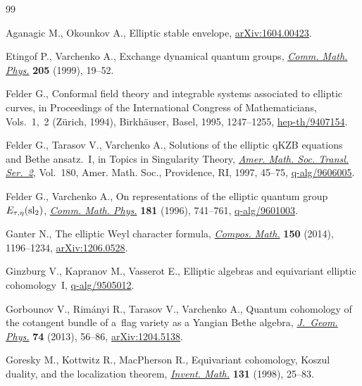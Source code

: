 \begin{thebibliography}{99}
\footnotesize\itemsep=0.5pt

Aganagic M., Okounkov A., Elliptic stable envelope, \href{https://arxiv.org/abs/1604.00423}{arXiv:1604.00423}.

Etingof P., Varchenko A., Exchange dynamical quantum groups, \href{https://doi.org/10.1007/s002200050665}{\textit{Comm.
 Math. Phys.}} \textbf{205} (1999), 19--52.

Felder G., Conformal field theory and integrable systems associated to elliptic
 curves, in Proceedings of the {I}nternational {C}ongress of {M}athematicians,
 {V}ols.~1,~2 ({Z}\"{u}rich, 1994), Birkh\"{a}user, Basel, 1995, 1247--1255,
 \href{https://arxiv.org/abs/hep-th/9407154}{hep-th/9407154}.

Felder G., Tarasov V., Varchenko A., Solutions of the elliptic q{KZB} equations
 and {B}ethe ansatz.~{I}, in Topics in Singularity Theory, \href{https://doi.org/10.1090/trans2/180/04}{\textit{Amer. Math.
 Soc. Transl. Ser.~2}}, Vol.~180, Amer. Math. Soc., Providence, RI, 1997,
 45--75, \href{https://arxiv.org/abs/q-alg/9606005}{q-alg/9606005}.

Felder G., Varchenko A., On representations of the elliptic quantum group
 {$E_{\tau,\eta}({\rm sl}_2)$}, \href{https://doi.org/10.1007/BF02101296}{\textit{Comm. Math. Phys.}} \textbf{181}
 (1996), 741--761, \href{https://arxiv.org/abs/q-alg/9601003}{q-alg/9601003}.

Ganter N., The elliptic {W}eyl character formula, \href{https://doi.org/10.1112/S0010437X1300777X}{\textit{Compos. Math.}}
 \textbf{150} (2014), 1196--1234, \href{https://arxiv.org/abs/1206.0528}{arXiv:1206.0528}.

Ginzburg V., Kapranov M., Vasserot E., Elliptic algebras and equivariant
 elliptic cohomology~{I}, \mbox{\href{https://arxiv.org/abs/q-alg/9505012}{q-alg/9505012}}.

Gorbounov V., Rim\'{a}nyi R., Tarasov V., Varchenko A., Quantum cohomology of
 the cotangent bundle of a~flag variety as a {Y}angian {B}ethe algebra,
 \href{https://doi.org/10.1016/j.geomphys.2013.07.006}{\textit{J.~Geom. Phys.}} \textbf{74} (2013), 56--86, \href{https://arxiv.org/abs/1204.5138}{arXiv:1204.5138}.

Goresky M., Kottwitz R., MacPherson R., Equivariant cohomology, {K}oszul
 duality, and the localization theorem, \href{https://doi.org/10.1007/s002220050197}{\textit{Invent. Math.}} \textbf{131}
 (1998), 25--83.


\end{thebibliography}
